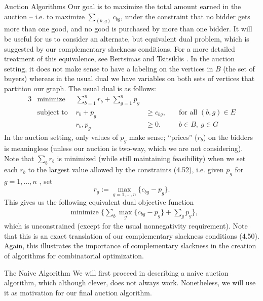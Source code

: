 \begin{section}{Auction Algorithms}
	Our goal is to maximize the total amount earned in the auction -- i.e. to 
	maximize $\sum_{(b,g)} c_{bg}$, under the constraint that no bidder gets more than one good, 
	and no good is purchased by more than one bidder.
	It will be useful for us to consider an alternate, but equivalent dual problem, which is 
	suggested by our complementary slackness conditions. For a more detailed treatment of this 
	equivalence, see Bertsimas and Tsitsiklis \cite{bertsimas1997introduction}. 
	In the auction setting, it does not make 
	sense to have a labeling on the vertices in $B$ (the set of buyers) whereas in the usual dual we 
	have variables on both sets of vertices that partition our graph. The usual dual is as 
	follows:
	\begin{alignat}{3}
		& \text{minimize } & \sum_{b=1}^n r_b + \sum_{g=1}^n p_g & \\
		& \text{subject to } & r_b + p_g & \geq c_{bg}, &\quad \text{for all } (b,g)\in E\\
				     && r_b,p_g & \geq 0. & \quad b\in B,\ g\in G
	\end{alignat}
	In the auction setting, only 
	values of $p_g$ make sense; ``prices'' ($r_b$) on the bidders is meaningless (unless our 
	auction is two-way, which we are not considering). 
	Note that $\sum_b r_b$ is minimized (while still maintaining feasibility) when we set each 
	$r_b$ to the largest value allowed by the constraints (4.52), i.e. given $p_{g}$ for 
	$g=1, \dots, n$ , set
	\[
		r_{g} := \max_{g=1,\dots, n} \{c_{bg} - p_g\}.
	\]
	This gives us the following equivalent dual objective function 
	\begin{align}
		&\text{minimize }\{ \sum_b \max_g \{c_{bg} - p_g\} + \sum_g p_g\},
	\end{align}
	which is unconstrained (except for the usual nonnegativity requirement). 
	Note that this is an exact translation of our complementary slackness 
	conditions (4.50). Again, this illustrates the importance of complementary slackness in the 
	creation of algorithms for combinatorial optimization.

	\begin{subsection}{The Naive Algorithm}
		We will first proceed in describing a naive auction algorithm, which although clever, 
		does not always work. Nonetheless, we will use it as motivation for 
		our final auction algorithm.


\end{subsection}
\end{section}
